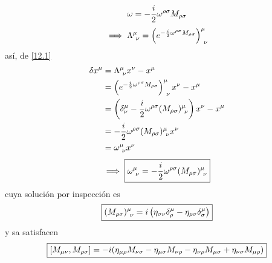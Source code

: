 \begin{equation}
  \omega=-\frac{i}{2}\omega^{\rho\sigma }M_{\rho\sigma }
\end{equation}
\begin{equation}
  \implies \Lambda^\mu_{~\nu } =\left(e^{-\frac{i}{2}\omega^{\rho\sigma }M_{\rho\sigma }}\right)^\mu_{~\nu }
\end{equation}
así, de \eqref{12.1}
\begin{align}
  \delta x^\mu &=\Lambda^\mu_{~\nu } x^\nu-x^\mu \\
  &=\left(e^{-\frac{i}{2}\omega^{\rho\sigma }M_{\rho\sigma }}\right)^\mu_{~\nu }x^\nu -x^\mu \\
  &=\left(\delta^\mu_\nu -\frac{i}{2}\omega^{\rho\sigma }(M_{\rho\sigma })^\mu_{~\nu }\right)x^\nu -x^\mu \\
  &=-\frac{i}{2}\omega^{\rho\sigma }(M_{\rho\sigma })^\mu_{~\nu }x^\nu \\
  &=\omega^\mu_{~\nu } x^\nu 
\end{align}
\begin{equation}
  \implies \boxed{\omega^\mu_{~\nu } =-\frac{i}{2}\omega^{\rho\sigma }(M_{\rho\sigma })^\mu_{~\nu }}
\end{equation}
cuya solución por inspección es
\begin{equation}
	\boxed{(M_{\rho\sigma })^\mu_{~\nu }=i\left(\eta_{\sigma\nu }\delta^\mu_\rho-\eta_{\rho\sigma}\delta^\mu_\sigma \right)}
\end{equation}
y sa satisfacen 
\begin{equation}
  \boxed{[M_{\mu\nu},M_{\rho\sigma }]=-i(\eta_{\mu\rho}M_{\nu\sigma }-\eta_{\mu\sigma }M_{\nu\rho }-\eta_{\nu\rho}M_{\mu\sigma }+\eta_{\nu\sigma }M_{\mu\rho})}
\end{equation}


























































